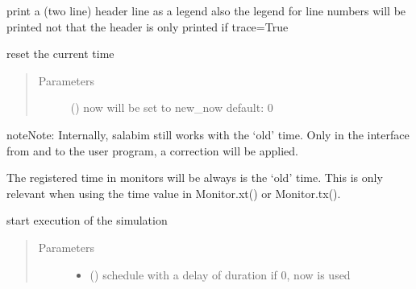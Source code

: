 \documentclass[letterpaper,10pt,english]{sphinxmanual}
\begin{document}
\begin{fulllineitems}
\begin{fulllineitems}
\end{fulllineitems}


\begin{fulllineitems}
\label{\detokenize{Reference:salabim.Environment.print_trace_header}}
print a (two line) header line as a legend 
also the legend for line numbers will be printed 
not that the header is only printed if trace=True

\end{fulllineitems}


\begin{fulllineitems}
\label{\detokenize{Reference:salabim.Environment.reset_now}}
reset the current time
\begin{quote}\begin{description}
\item[{Parameters}] \leavevmode
{} () \textendash{} now will be set to new\_now 
default: 0

\end{description}\end{quote}

\begin{sphinxadmonition}{note}{Note:}
Internally, salabim still works with the ‘old’ time. Only in the interface
from and to the user program, a correction will be applied.

The registered time in monitors will be always is the ‘old’ time.
This is only relevant when using the time value in Monitor.xt() or Monitor.tx().
\end{sphinxadmonition}

\end{fulllineitems}


\begin{fulllineitems}
\label{\detokenize{Reference:salabim.Environment.run}}
start execution of the simulation
\begin{quote}\begin{description}
\item[{Parameters}] \leavevmode\begin{itemize}
\item {} 
 () \textendash{} schedule with a delay of duration 
if 0, now is used


\end{itemize}
\end{description}
\end{quote}
\end{fulllineitems}
\end{fulllineitems}
\end{document}
